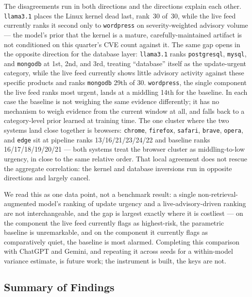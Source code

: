 \documentclass[acmsmall,review,anonymous,screen]{acmart}
\begin{document}
The disagreements run in both directions and the directions explain each
other. \texttt{llama3.1} places the Linux kernel dead last, rank~30 of~30,
while the live feed currently ranks it second only to \texttt{wordpress} on
severity-weighted advisory volume --- the model's prior that the kernel is a
mature, carefully-maintained artifact is not conditioned on this quarter's
CVE count against it. The same gap opens in the opposite direction for the
database layer: \texttt{llama3.1} ranks \texttt{postgresql},
\texttt{mysql}, and \texttt{mongodb} at 1st, 2nd, and 3rd, treating
``database'' itself as the update-urgent category, while the live feed
currently shows little advisory activity against these specific products
and ranks \texttt{mongodb} 29th of 30. \texttt{wordpress}, the single
component the live feed ranks most urgent, lands at a middling 14th for the
baseline. In each case the baseline is not weighing the same evidence
differently; it has no mechanism to weigh evidence from the current window
at all, and falls back to a category-level prior learned at training time.
The one cluster where the two systems land close together is browsers:
\texttt{chrome}, \texttt{firefox}, \texttt{safari}, \texttt{brave},
\texttt{opera}, and \texttt{edge} sit at pipeline ranks
13/16/21/23/24/22 and baseline ranks 16/17/18/19/20/21 --- both systems treat
the browser cluster as middling-to-low urgency, in close to the same
relative order. That local agreement does not rescue the aggregate
correlation: the kernel and database inversions run in opposite directions
and largely cancel.

We read this as one data point, not a benchmark result: a single
non-retrieval-augmented model's ranking of update urgency and a
live-advisory-driven ranking are not interchangeable, and the gap is largest
exactly where it is costliest --- on the component the live feed currently
flags as highest-risk, the parametric baseline is unremarkable, and on the
component it currently flags as comparatively quiet, the baseline is most
alarmed. Completing this comparison with ChatGPT and Gemini, and repeating it
across seeds for a within-model variance estimate, is future work; the
instrument is built, the keys are not.

\subsection{Summary of Findings}\label{sec:results-summary}
\end{document}
